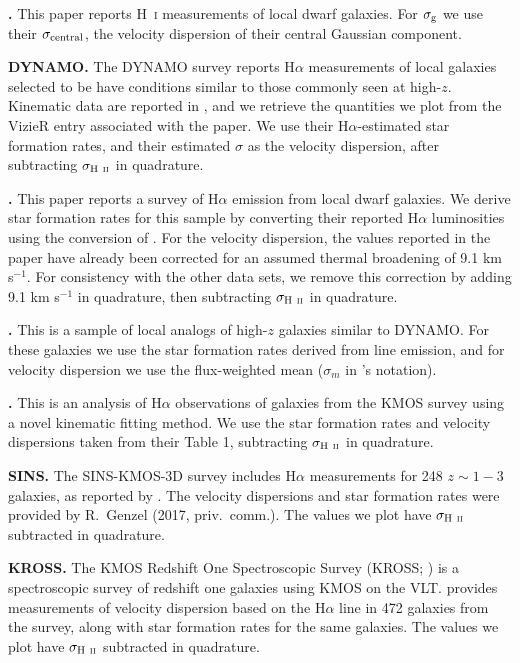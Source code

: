 \documentclass[useAMS,usenatbib]{mn2e}
\begin{document}
\begin{appendix}
\textbf{\citet{stilp13a}.} This paper reports H~\textsc{i} measurements of local dwarf galaxies. For $\sigma_{\rm g}$ we use their $\sigma_{\rm central}$, the velocity dispersion of their central Gaussian component.

\textbf{DYNAMO.} The DYNAMO survey reports H$\alpha$ measurements of local galaxies selected to be have conditions similar to those commonly seen at high-$z$. Kinematic data are reported in \citet{green14a}, and we retrieve the quantities we plot from the VizieR entry associated with the paper. We use their H$\alpha$-estimated star formation rates, and their estimated $\sigma$ as the velocity dispersion, after subtracting $\sigma_{\rm H~\textsc{ii}}$ in quadrature.

\textbf{\citet{moiseev15a}.} This paper reports a survey of H$\alpha$ emission from local dwarf galaxies. We derive star formation rates for this sample by converting their reported H$\alpha$ luminosities using the conversion of \citet{kennicutt12a}. For the velocity dispersion, the values reported in the paper have already been corrected for an assumed thermal broadening of 9.1 km s$^{-1}$. For consistency with the other data sets, we remove this correction by adding 9.1 km s$^{-1}$ in quadrature, then subtracting $\sigma_{\rm H~\textsc{ii}}$ in quadrature.

\textbf{\citet{varidel16a}.} This is a sample of local analogs of high-$z$ galaxies similar to DYNAMO. For these galaxies we use the star formation rates derived from line emission, and for velocity dispersion we use the flux-weighted mean ($\sigma_m$ in \citeauthor{varidel16a}'s notation).

\textbf{\citet{di-teodoro16a}.} This is an analysis of H$\alpha$ observations of galaxies from the KMOS survey \citep{wisnioski15a} using a novel kinematic fitting method. We use the star formation rates and velocity dispersions taken from their Table 1, subtracting $\sigma_{\rm H~\textsc{ii}}$ in quadrature.

\textbf{SINS.} The SINS-KMOS-3D survey \citep{wisnioski15a} includes H$\alpha$ measurements for 248 $z\sim 1-3$ galaxies, as reported by \citet{wuyts16a}. The velocity dispersions and star formation rates were provided by R.~Genzel (2017, priv.~comm.). The values we plot have $\sigma_{\rm H~\textsc{ii}}$ subtracted in quadrature.

\textbf{KROSS.} The KMOS Redshift One Spectroscopic Survey (KROSS; \citealt{stott16a}) is a spectroscopic survey of redshift one galaxies using KMOS on the VLT. \citet{johnson17a} provides measurements of velocity dispersion based on the H$\alpha$ line in 472 galaxies from the survey, along with star formation rates for the same galaxies. The values we plot have $\sigma_{\rm H~\textsc{ii}}$ subtracted in quadrature.


\end{appendix}
\end{document}

